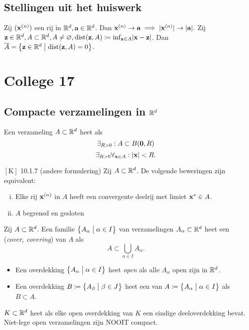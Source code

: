 \documentclass{2wa40summary}
\begin{document}
	\subsection{Stellingen uit het huiswerk}
	\theorem Zij $({\textbf{x}}^{(n)})$ een rij in $\mathbb{R}^d, {\textbf{a}} \in \mathbb{R}^d$. Dan ${\textbf{x}}^{(n)}\to {\textbf{a}} \implies |{\textbf{x}}^{(n)}|\to |{\textbf{a}}|.$
	\theorem Zij ${\textbf{z}} \in \mathbb{R}^d, A \subset \mathbb{R}^d, A \neq \varnothing, \text{dist}({\textbf{z}},A) \coloneqq  \text{inf}_{{\textbf{x}}\in A}|{\textbf{x}}-{\textbf{z}}|$.
	Dan $\overline{A}=\big\{{\textbf{z}}\in \mathbb{R}^d \bigm| \text{dist}({\textbf{z}},A)=0\big\}$.
	\newpage
	\section{College 17}
	\subsection{Compacte verzamelingen in $\mathbb{R}^d$}
	 Een verzameling $A\subset\mathbb{R}^d$ heet  als \[\exists _{R>0}: A \subset B({\textbf{0}},R)\]
	\[\exists _{R>0} \forall _{{\textbf{x}}\in A}: {\left|{\textbf{x}}\right|}<R.\]
	
	\theorem $\left[\text{K}\right]$ 10.1.7 (andere formulering)
	Zij $A \subset \mathbb{R}^d$. De volgende beweringen zijn equivalent:
	\begin{enumerate}[(i)]
		\item Elke rij ${\textbf{x}}^{(n)}$ in $A$ heeft een convergente deelrij met limiet ${\textbf{x}}^* \in A$.
		\item $A$ begrensd en gesloten
	\end{enumerate}
	
	 Zij $A \subset \mathbb{R}^d$. Een familie $\big\{A_\alpha \bigm| \alpha \in I \big\}$ van verzamelingen $A_\alpha \subset \mathbb{R}^d$ heet een  (\textit{cover, covering}) van $A$ als \[A \subset \bigcup_{\alpha \in I}A_\alpha.\]
	
	\begin{itemize}
		\item Een overdekking $\big\{ A_\alpha \bigm| \alpha \in I \big\}$ heet \textit{open} als alle $A_\alpha$ open zijn in $\mathbb{R}^d$.
		\item Een overdekking $B\coloneqq \big\{ A_\beta \bigm| \beta \in J\big\}$ heet een  van $A\coloneqq \big\{ A_\alpha \bigm| \alpha \in I \big\}$ als $B \subset A$.
	\end{itemize}
	
	 $K \subset \mathbb{R}^d$ heet  als elke open overdekking van $K$ een eindige deeloverdekking bevat.
	\valkuil Niet-lege open verzamelingen zijn NOOIT compact.
	
\end{document}
